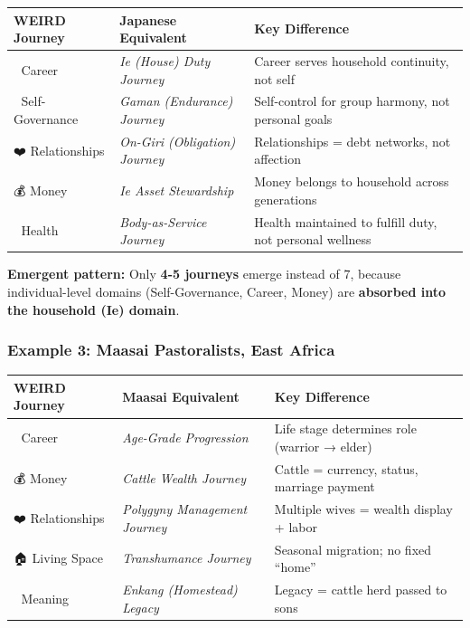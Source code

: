 {{{\begin{center}
\small
\begin{tabular}{@{}lll@{}}
\toprule
\textbf{WEIRD Journey} & \textbf{Japanese Equivalent} & \textbf{Key Difference} \\
\midrule
💼 Career & \textit{Ie (House) Duty Journey} & Career serves household continuity, not self \\
🧠 Self-Governance & \textit{Gaman (Endurance) Journey} & Self-control for group harmony, not personal goals \\
❤️ Relationships & \textit{On-Giri (Obligation) Journey} & Relationships = debt networks, not affection \\
💰 Money & \textit{Ie Asset Stewardship} & Money belongs to household across generations \\
🏥 Health & \textit{Body-as-Service Journey} & Health maintained to fulfill duty, not personal wellness \\
\bottomrule
\end{tabular}
\end{center}

\textbf{Emergent pattern:} Only \textbf{4-5 journeys} emerge instead of 7, because individual-level domains (Self-Governance, Career, Money) are \textbf{absorbed into the household (Ie) domain}.

\subsubsection{Example 3: Maasai Pastoralists, East Africa}

\begin{center}
\small
\begin{tabular}{@{}lll@{}}
\toprule
\textbf{WEIRD Journey} & \textbf{Maasai Equivalent} & \textbf{Key Difference} \\
\midrule
💼 Career & \textit{Age-Grade Progression} & Life stage determines role (warrior → elder) \\
💰 Money & \textit{Cattle Wealth Journey} & Cattle = currency, status, marriage payment \\
❤️ Relationships & \textit{Polygyny Management Journey} & Multiple wives = wealth display + labor \\
🏠 Living Space & \textit{Transhumance Journey} & Seasonal migration; no fixed ``home'' \\
🧭 Meaning & \textit{Enkang (Homestead) Legacy} & Legacy = cattle herd passed to sons \\
\bottomrule
\end{tabular}
\end{center}

}}}

